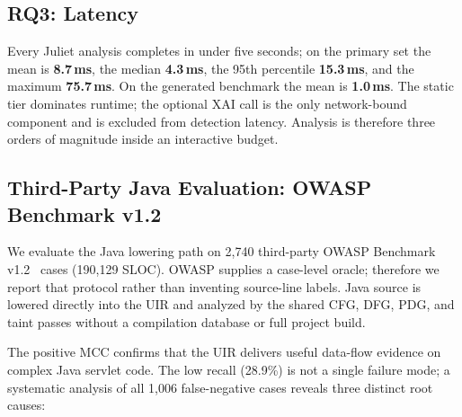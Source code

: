 \documentclass[10pt,conference]{IEEEtran}
\begin{document}
\subsection{RQ3: Latency}
Every Juliet analysis completes in under five seconds; on the primary set
the mean is \textbf{8.7\,ms}, the median \textbf{4.3\,ms}, the 95th
percentile \textbf{15.3\,ms}, and the maximum \textbf{75.7\,ms}. On the
generated benchmark the mean is \textbf{1.0\,ms}. The static tier dominates
runtime; the optional XAI call is the only network-bound component and is
excluded from detection latency. Analysis is therefore three orders of
magnitude inside an interactive budget.

\subsection{Third-Party Java Evaluation: OWASP Benchmark v1.2}
\label{sec:owasp}
We evaluate the Java lowering path on 2{,}740 third-party OWASP Benchmark
v1.2~\cite{owaspbenchmark} cases (190{,}129 SLOC). OWASP supplies a case-level oracle; therefore we
report that protocol rather than inventing source-line labels. Java source is
lowered directly into the UIR and analyzed by the shared CFG, DFG, PDG, and
taint passes without a compilation database or full project build.

\begin{table}[t]
\centering
\caption{Third-party Java evaluation on OWASP Benchmark v1.2, case level.}
\label{tab:owasp_results}
\end{table}

The positive MCC confirms that the UIR delivers useful data-flow evidence on
complex Java servlet code. The low recall (28.9\%) is not a single failure
mode; a systematic analysis of all 1{,}006 false-negative cases reveals three
distinct root causes:
\end{document}
